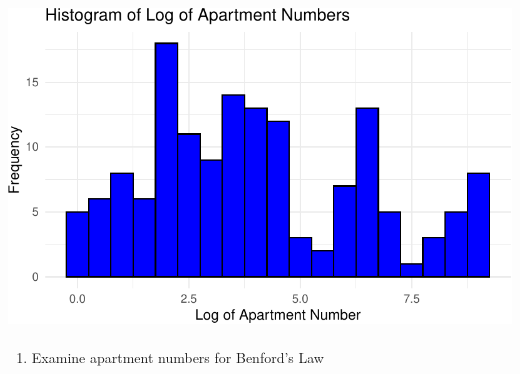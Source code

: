 \documentclass[
  12pt,
]{article}
\makeatletter
\let\oldparagraph\paragraph
\renewcommand{\paragraph}{
    \@ifstar
      \xxxParagraphStar
      \xxxParagraphNoStar
  }
\newcommand{\xxxParagraphStar}[1]{\oldparagraph*{#1}\mbox{}}
\newcommand{\xxxParagraphNoStar}[1]{\oldparagraph{#1}\mbox{}}
\providecommand{\tightlist}{%
  \setlength{\itemsep}{0pt}\setlength{\parskip}{0pt}}\usepackage{longtable,booktabs,array}
\makeatother
\begin{document}
\includegraphics{HW-3-Q1-Q2-Q3_files/figure-pdf/unnamed-chunk-32-1.pdf}

\paragraph{}\label{section}

\begin{enumerate}
\def\labelenumi{\arabic{enumi}.}
\setcounter{enumi}{4}
\tightlist
\item
  Examine apartment numbers for Benford's Law
\end{enumerate}
\end{document}
